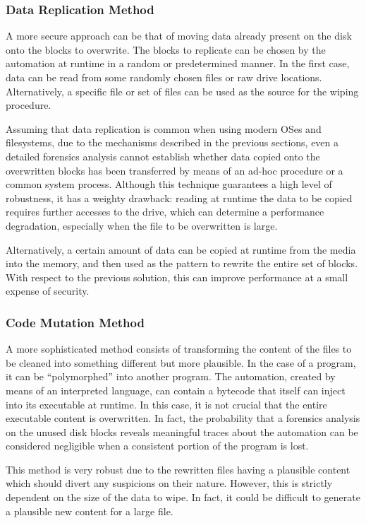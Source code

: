 \documentclass[conference]{IEEEtran}
\begin{document}
\subsubsection{Data Replication Method}
A more secure approach can be that of moving data already present on the disk onto the blocks to overwrite. The blocks to replicate can be chosen by the automation at runtime in a random or predetermined manner. In the first case, data can be read from some randomly chosen files or raw drive locations. Alternatively, a specific file or set of files can be used as the source for the wiping procedure.

\noindent Assuming that data replication is common when using modern OSes and filesystems, due to the mechanisms described in the previous sections, even a detailed forensics analysis cannot establish whether data copied onto the overwritten blocks has been transferred by means of an ad-hoc procedure or a common system process. Although this technique guarantees a high level of robustness, it has a weighty drawback: reading at runtime the data to be copied requires further accesses to the drive, which can determine a performance degradation, especially when the file to be overwritten is large.

\noindent Alternatively, a certain amount of data can be copied at runtime from the media into the memory, and then used as the pattern to rewrite the entire set of blocks. With respect to the previous solution, this can improve performance at a small expense of security.

\subsubsection{Code Mutation Method}
A more sophisticated method consists of transforming the content of the files to be cleaned into something different but more plausible.
In the case of a program, it can be ``polymorphed'' into another program. The automation, created by means of an interpreted language, can contain a bytecode that itself can inject into its executable at runtime. In this case, it is not crucial that the entire executable content is overwritten. In fact, the probability that a forensics analysis on the unused disk blocks reveals meaningful traces about the automation can be considered negligible when a consistent portion of the program is lost.

\noindent This method is very robust due to the rewritten files having a plausible content which should divert any suspicions on their nature. However, this is strictly dependent on the size of the data to wipe. In fact, it could be difficult to generate a plausible new content for a large file.
\end{document}
